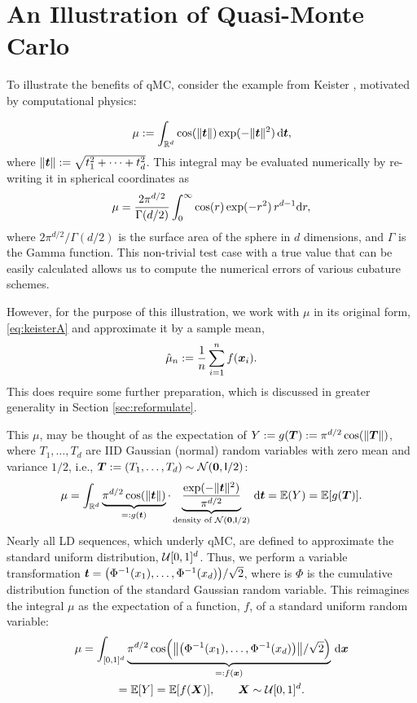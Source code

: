 \documentclass{svproc}
\begin{document}
%
\section{An Illustration of Quasi-Monte Carlo} \label{sec:practice}

To illustrate the benefits of qMC, consider the example from Keister \cite[(13)]{Kei96}, motivated by computational physics:

\begin{equation}\label{eq:keisterA}
	\mu := \int_{\mathbb{R}^d} \cos(\lVert {\boldsymbol{t}} \rVert) \exp(-\lVert {\boldsymbol{t}} \rVert^2) \, {\mathrm{d}} {\boldsymbol{t}},
\end{equation}
where $\lVert {\boldsymbol{t}} \rVert := \sqrt{t_1^2 + \cdots + t_d^2}$.  This integral may be evaluated numerically by re-writing it in spherical coordinates as
\begin{equation}\label{eq:keisterExact}
	\mu = \frac{2 \pi^{d/2}}{\Gamma(d/2)}\int_{0}^{\infty} \cos(r) \exp(-r^2) \, r^{d-1} {\mathrm{d}} r,
\end{equation}
where $2 \pi^{d/2}/\Gamma(d/2)$ is the surface area of the sphere in $d$ dimensions, and $\Gamma$ is the Gamma function.  This non-trivial test case with a true value that can be easily calculated allows us to compute the numerical errors of various cubature schemes.

However, for the purpose of this illustration, we work with $\mu$ in its original form, \eqref{eq:keisterA} and approximate it by a sample mean,
\begin{equation} \label{eq:sample_mean}
	\hat{\mu}_n := \frac 1n \sum_{i=1}^n f({\boldsymbol{x}}_i).
\end{equation}
This does require some further preparation, which is discussed in greater generality in Section \ref{sec:reformulate}.

This $\mu$, may be thought of as the expectation of $Y := g({\boldsymbol{T}}) := \pi^{d/2} \cos(\lVert {\boldsymbol{T}} \rVert)$, where $T_1, \ldots, T_d$ are IID Gaussian (normal) random variables with zero mean and variance $1/2$, i.e., ${\boldsymbol{T}} :=(T_1, \ldots, T_d) \sim {\mathcal{N}}({\boldsymbol{0}},\mathsf{I}/2)$:
\begin{equation}\label{eq:keisterB}
	\mu = \int_{\mathbb{R}^d} \underbrace{\pi^{d/2} \cos(\lVert {\boldsymbol{t}} \rVert)}_{=:g({\boldsymbol{t}})} \cdot \underbrace{\frac{\exp(-\lVert {\boldsymbol{t}} \rVert^2)}{\pi^{d/2}}}_{\text{density of } {\mathcal{N}}({\boldsymbol{0}},\mathsf{I}/2)} \, {\mathrm{d}} {\boldsymbol{t}} = {\mathbb{E}}(Y) = {\mathbb{E}}[g({\boldsymbol{T}})].
\end{equation}
Nearly all LD sequences, which underly qMC, are defined to approximate the standard uniform distribution, ${\mathcal{U}}[0,1]^d$.  Thus, we perform a variable transformation ${\boldsymbol{t}} = \bigl (\Phi^{-1}(x_1), \ldots, \Phi^{-1}(x_d) \bigr )/\sqrt{2}$, where is $\Phi$ is the cumulative distribution function of the standard Gaussian random variable.  This reimagines the integral $\mu$ as the expectation of a function, $f$, of a standard uniform random variable:
\begin{multline}\label{eq:keisterC}
	\mu = \int_{[0,1]^d} \underbrace{\pi^{d/2} \cos\Bigl (\bigl \lVert \bigl( \Phi^{-1}(x_1), \ldots, \Phi^{-1}(x_d)\bigr) \bigr\rVert/\sqrt{2}  \Bigr)}_{=:f({\boldsymbol{x}})} \, {\mathrm{d}} {\boldsymbol{x}} \\
	= {\mathbb{E}}[Y]
	= {\mathbb{E}}[f({\boldsymbol{X}})], \qquad {\boldsymbol{X}} \sim {\mathcal{U}}[0,1]^d.
\end{multline}
\end{document}
